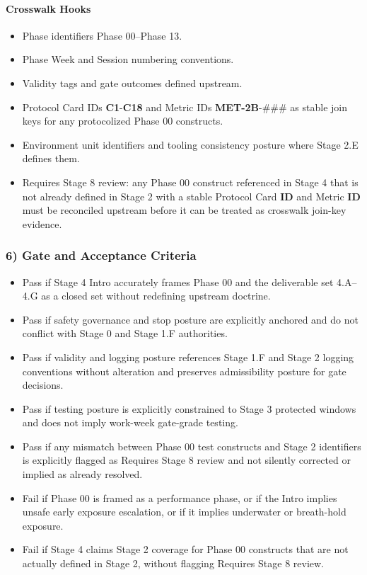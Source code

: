 \documentclass[10pt]{article}
\begin{document}
\paragraph*{Crosswalk Hooks}

\begin{itemize}
\item Phase identifiers Phase 00–Phase 13.
\item Phase Week and Session numbering conventions.
\item Validity tags and gate outcomes defined upstream.
\item Protocol Card IDs \textbf{C1}-\textbf{C18} and Metric IDs \textbf{MET-2B}-### as stable join keys for any protocolized Phase 00 constructs.
\item Environment unit identifiers and tooling consistency posture where Stage 2.E defines them.
\item Requires Stage 8 review: any Phase 00 construct referenced in Stage 4 that is not already defined in Stage 2 with a stable Protocol Card \textbf{ID} and Metric \textbf{ID} must be reconciled upstream before it can be treated as crosswalk join-key evidence.
\end{itemize}

\subsubsection*{6) Gate and Acceptance Criteria}

\begin{itemize}
\item Pass if Stage 4 Intro accurately frames Phase 00 and the deliverable set 4.A–4.G as a closed set without redefining upstream doctrine.
\item Pass if safety governance and stop posture are explicitly anchored and do not conflict with Stage 0 and Stage 1.F authorities.
\item Pass if validity and logging posture references Stage 1.F and Stage 2 logging conventions without alteration and preserves admissibility posture for gate decisions.
\item Pass if testing posture is explicitly constrained to Stage 3 protected windows and does not imply work-week gate-grade testing.
\item Pass if any mismatch between Phase 00 test constructs and Stage 2 identifiers is explicitly flagged as Requires Stage 8 review and not silently corrected or implied as already resolved.
\item Fail if Phase 00 is framed as a performance phase, or if the Intro implies unsafe early exposure escalation, or if it implies underwater or breath-hold exposure.
\item Fail if Stage 4 claims Stage 2 coverage for Phase 00 constructs that are not actually defined in Stage 2, without flagging Requires Stage 8 review.
\end{itemize}
\end{document}
